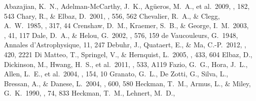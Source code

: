 \documentclass[apj]{emulateapj}
\begin{document}
\begin{thebibliography}{}
 Abazajian, K.~N.,
  Adelman-McCarthy, J.~K., Ag{\"u}eros, M.~A., et al.\ 2009, \apjs,
  182, 543
 Chary, R., \& Elbaz, D.\ 2001,
  \apj, 556, 562
 Chevalier, R.~A., \& Clegg,
  A.~W.\ 1985, \nat, 317, 44
 Crenshaw, D.~M., Kraemer,
  S.~B., \& George, I.~M.\ 2003, \araa, 41, 117
 Dale, D.~A., \& Helou, G.\ 2002,
  \apj, 576, 159
 de Vaucouleurs, G.\ 1948,
  Annales d'Astrophysique, 11, 247
 Debuhr, J., Quataert, E., \& Ma,
  C.-P.\ 2012, \mnras, 420, 2221
 Di Matteo, T., Springel, V.,
  \& Hernquist, L.\ 2005, \nat, 433, 604
 Elbaz, D., Dickinson, M., Hwang,
  H.~S., et al.\ 2011, \aap, 533, A119
 Fazio, G.~G., Hora, J.~L., Allen,
  L.~E., et al.\ 2004, \apjs, 154, 10
 Granato, G.~L., De Zotti, G.,
  Silva, L., Bressan, A., \& Danese, L.\ 2004, \apj, 600, 580
 Heckman, T.~M., Armus, L., \&
  Miley, G.~K.\ 1990, \apjs, 74, 833
 Heckman, T.~M., Lehnert, M.~D.,

\end{thebibliography}
\end{document}
